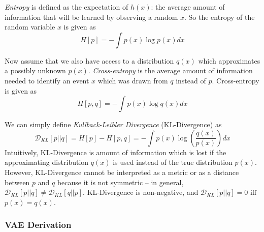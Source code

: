 \textit{Entropy} is defined as the expectation of $h(x)$: the average amount of information that will be learned by observing a random $x$. So the entropy of the random variable $x$ is given as 
\begin{equation}
  H[p] = - \int p(x) \log p(x)dx
  \label{eq:entropy}
\end{equation}

Now assume that we also have access to a distribution $q(x)$ which approximates a possibly unknown $p(x)$. \textit{Cross-entropy} is the average amount of information needed to identify an event $x$ which was drawn from $q$ instead of $p$. Cross-entropy is given as
\begin{equation}
  H[p,q] = - \int p(x) \log q(x) dx
  \label{eq:xentropy}
\end{equation}

We can simply define \textit{Kullback-Leibler Divergence} (KL-Divergence) \cite{kullback1951} as 
\begin{equation}
  \mathcal{D}_{KL}\left[ p || q \right] = H[p] - H[p,q] = - \int p(x) \log \left(\frac{q(x)}{p(x)} \right)dx
  \label{eq:kl_div}
\end{equation}
Intuitively, KL-Divergence is amount of information which is lost if the approximating distribution $q(x)$ is used instead of the true distribution $p(x)$. However, KL-Divergence cannot be interpreted as a metric or as a distance between $p$ and $q$ because it is not symmetric -- in general, $\mathcal{D}_{KL}[p||q] \not = \mathcal{D}_{KL}[q||p]$. KL-Divergence is non-negative, and $\mathcal{D}_{KL}[p||q] = 0$ iff $p(x) = q(x)$.

\subsubsection{VAE Derivation}

